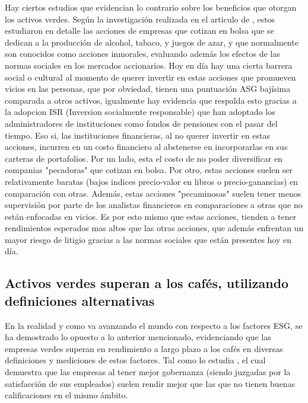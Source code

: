 Hay ciertos estudios que evidencian lo contrario sobre los beneficios que otorgan los activos verdes. Según la investigación realizada en el articulo de , estos estudiaron en detalle las acciones de empresas que cotizan en bolsa que se dedican a la producción de alcohol, tabaco, y juegos de azar, y que normalmente son conocidos como acciones inmorales, evaluando además los efectos de las normas sociales en los mercados accionarios. 
\vspace{0.5cm}
Hoy en día hay una cierta barrera social o cultural al momento de querer invertir en estas acciones que promueven vicios en las personas, que por obviedad, tienen una puntuación ASG bajísima comparada a otros activos, igualmente hay evidencia que respalda esto gracias a la adopcion ISR (Inversion socialmente responsable) que han adoptado los administradores de instituciones como fondos de pensiones con el pasar del tiempo. Eso si, las instituciones financieras, al no querer invertir en estas acciones, incurren en un costo financiero al abstenerse en incorporarlas en sus carteras de portafolios. Por un lado, esta el costo de no poder diversificar en companias "pecadoras" que cotizan en bolsa. Por otro, estas acciones suelen ser relativamente baratas (bajos indices precio-valor en libros o precio-ganancias) en comparación con otras. Además, estas acciones "pecaminosas" suelen tener menos supervisión por parte de los analistas financieros en comparaciones a otras que no están enfocadas en vicios. Es por esto mismo que estas acciones, tienden a tener rendimientos esperados mas altos que las otras acciones, que además enfrentan un mayor riesgo de litigio gracias a las normas sociales que están presentes hoy en día.

\vspace{0.5cm}

\subsection{Activos verdes superan a los cafés, utilizando definiciones alternativas}
En la realidad y como va avanzando el mundo con respecto a los factores ESG, se ha demostrado lo opuesto a lo anterior mencionado, evidenciando que las empresas verdes superan en rendimiento a largo plazo a los cafés en diversas definiciones y mediciones de estos factores. Tal como lo estudia , el cual demuestra que las empresas al tener mejor gobernanza (siendo juzgadas por la satisfacción de sus empleados) suelen rendir mejor que las que no tienen buenas calificaciones en el mismo ámbito. 

